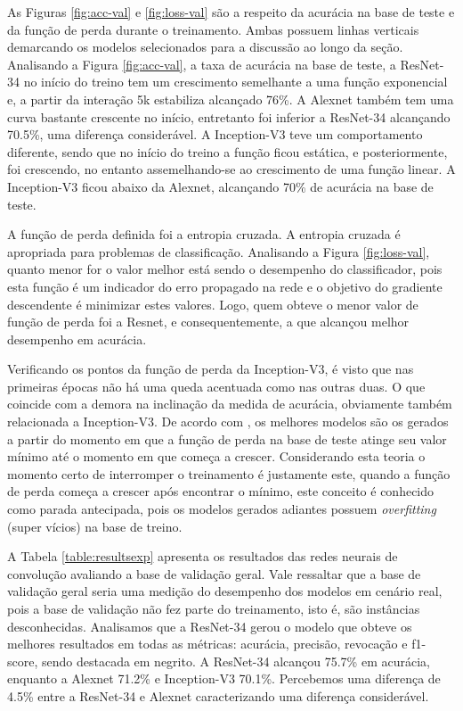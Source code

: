 As Figuras \ref{fig:acc-val} e \ref{fig:loss-val} são a respeito da acurácia na base de teste e da função de perda durante o treinamento. Ambas possuem linhas verticais demarcando os modelos selecionados para a discussão ao longo da seção. Analisando a Figura \ref{fig:acc-val}, a taxa de acurácia na base de teste, a ResNet-34 no início do treino tem um crescimento semelhante a uma função exponencial e, a partir da interação 5k estabiliza alcançado 76\%. A Alexnet também tem uma curva bastante crescente no início, entretanto foi inferior a ResNet-34 alcançando 70.5\%, uma diferença considerável. A Inception-V3 teve um comportamento diferente, sendo que no início do treino a função ficou estática, e posteriormente, foi crescendo, no entanto assemelhando-se ao crescimento de uma função linear. A Inception-V3 ficou abaixo da Alexnet, alcançando 70\% de acurácia na base de teste. 

A função de perda definida foi a entropia cruzada. A entropia cruzada é apropriada para problemas de classificação. Analisando a Figura \ref{fig:loss-val}, quanto menor for o valor melhor está sendo o desempenho do classificador, pois esta função é um indicador do erro propagado na rede e o objetivo do gradiente descendente é minimizar estes valores. Logo, quem obteve o menor valor de função de perda foi a Resnet, e consequentemente, a que alcançou melhor desempenho em acurácia. 

Verificando os pontos da função de perda da Inception-V3, é visto que nas primeiras épocas não há uma queda acentuada como nas outras duas. O que coincide com a demora na inclinação da medida de acurácia, obviamente também relacionada a Inception-V3. De acordo com \cite{geron2017hands}, os melhores modelos são os gerados a partir do momento em que a função de perda na base de teste atinge seu valor mínimo até o momento em que começa a crescer. Considerando esta teoria o momento certo de interromper o treinamento é justamente este, quando a função de perda começa a crescer após encontrar o mínimo, este conceito é conhecido como parada antecipada, pois os modelos gerados adiantes possuem \textit{overfitting} (super vícios) na base de treino.

A Tabela \ref{table:resultsexp} apresenta os resultados das redes neurais de convolução avaliando a base de validação geral. Vale ressaltar que a base de validação geral seria uma medição do desempenho dos modelos em cenário real, pois a base de validação não fez parte do treinamento, isto é, são instâncias desconhecidas. Analisamos que a ResNet-34 gerou o modelo que obteve os melhores resultados em todas as métricas: acurácia, precisão, revocação e f1-score, sendo destacada em negrito. A ResNet-34 alcançou 75.7\% em acurácia, enquanto a Alexnet 71.2\% e Inception-V3 70.1\%. Percebemos uma diferença de 4.5\% entre a ResNet-34 e Alexnet caracterizando uma diferença considerável. 

